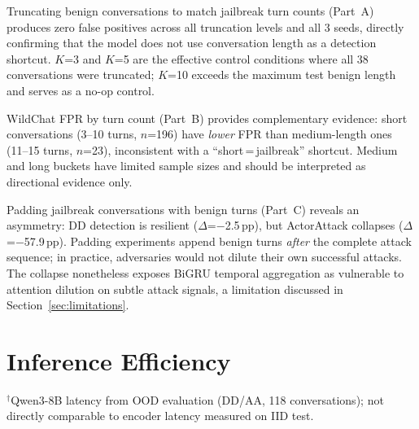 Truncating benign conversations to match jailbreak turn counts (Part~A) produces zero false positives across all truncation levels and all 3 seeds, directly confirming that the model does not use conversation length as a detection shortcut. $K$=3 and $K$=5 are the effective control conditions where all 38 conversations were truncated; $K$=10 exceeds the maximum test benign length and serves as a no-op control.

WildChat FPR by turn count (Part~B) provides complementary evidence: short conversations (3--10 turns, $n$=196) have \emph{lower} FPR than medium-length ones (11--15 turns, $n$=23), inconsistent with a ``short\,=\,jailbreak'' shortcut. Medium and long buckets have limited sample sizes and should be interpreted as directional evidence only.

Padding jailbreak conversations with benign turns (Part~C) reveals an asymmetry: DD detection is resilient ($\Delta$=$-$2.5\,pp), but ActorAttack collapses ($\Delta$=$-$57.9\,pp). Padding experiments append benign turns \emph{after} the complete attack sequence; in practice, adversaries would not dilute their own successful attacks. The collapse nonetheless exposes BiGRU temporal aggregation as vulnerable to attention dilution on subtle attack signals, a limitation discussed in Section~\ref{sec:limitations}.

\section{Inference Efficiency}
\label{app:efficiency}

\begin{table}[ht]
\centering
\footnotesize
\caption{Inference efficiency comparison. DeBERTa+BiGRU and TF-IDF+LR measured on IID test (76 conversations, avg 8.3 turns, single A100). LLM latency from separate OOD evaluation (118 conversations); cross-condition comparison is indicative only.}
\label{tab:efficiency}
\vspace{-2pt}
{\footnotesize $^{\dagger}$Qwen3-8B latency from OOD evaluation (DD/AA, 118 conversations); not directly comparable to encoder latency measured on IID test.}
\end{table}

